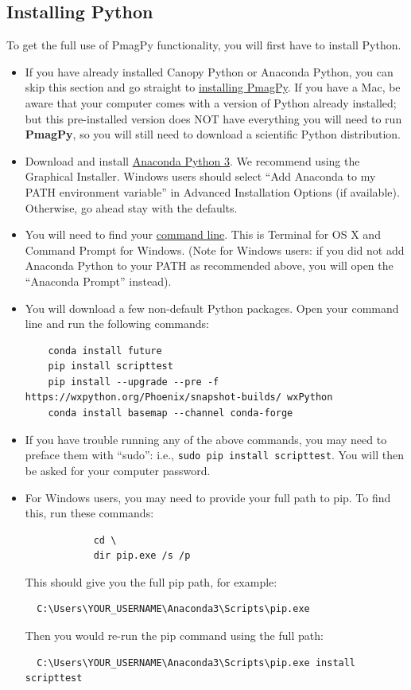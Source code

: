 \documentclass[11pt]{book}
\begin{document}
{\begin{itemize}
\subsection{Installing Python}

To get the full  use of PmagPy functionality, you will first have to install Python.


   \begin{itemize}
   \item If you have already installed Canopy Python or Anaconda Python, you can skip this section and go straight to \href{#pip_install}{installing PmagPy}.  If you have a Mac, be aware that your computer comes with a version of Python already installed; but this pre-installed version does NOT have everything you will need to run {\bf PmagPy}, so you will still need to download a scientific Python distribution.
   \item Download and install \href{https://www.continuum.io/downloads}{Anaconda Python 3}.  We recommend using the Graphical Installer.  Windows users should select ``Add Anaconda to my PATH environment variable'' in Advanced Installation Options (if available).  Otherwise, go ahead stay with the defaults.
   \item You will need to find your \href{#command_line}{command line}.  This is Terminal for OS X and Command Prompt for Windows.  (Note for Windows users: if you did not add Anaconda Python to your PATH as recommended above, you will open the ``Anaconda Prompt'' instead).

   \item You will download a few non-default Python packages.  Open your command line and run the following commands: \begin{verbatim}
    conda install future
    pip install scripttest
    pip install --upgrade --pre -f https://wxpython.org/Phoenix/snapshot-builds/ wxPython
    conda install basemap --channel conda-forge
\end{verbatim}

   \item If you have trouble running any of the above commands, you may need to preface them with ``sudo'': i.e., \texttt{sudo pip install scripttest}.  You will then be asked for your computer password.
   \item For Windows users, you may need to provide your full path to pip.  To find this, run these commands: \begin{verbatim}
            cd \
            dir pip.exe /s /p \end{verbatim}
     This should give you the full pip path, for example: \begin{verbatim}
  C:\Users\YOUR_USERNAME\Anaconda3\Scripts\pip.exe
\end{verbatim}
     Then you would re-run the pip command using the full path: \begin{verbatim}
  C:\Users\YOUR_USERNAME\Anaconda3\Scripts\pip.exe install scripttest
  \end{verbatim}


\end{itemize}
\end{itemize}}
\end{document}
